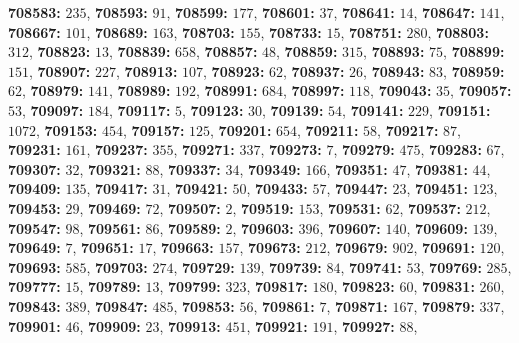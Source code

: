 \textsf{\bfseries 708583:} $235$, \textsf{\bfseries 708593:} $91$, \textsf{\bfseries 708599:} $177$, \textsf{\bfseries 708601:} $37$, \textsf{\bfseries 708641:} $14$, \textsf{\bfseries 708647:} $141$, \textsf{\bfseries 708667:} $101$, \textsf{\bfseries 708689:} $163$, \textsf{\bfseries 708703:} $155$, \textsf{\bfseries 708733:} $15$, \textsf{\bfseries 708751:} $280$, \textsf{\bfseries 708803:} $312$, \textsf{\bfseries 708823:} $13$, \textsf{\bfseries 708839:} $658$, \textsf{\bfseries 708857:} $48$, \textsf{\bfseries 708859:} $315$, \textsf{\bfseries 708893:} $75$, \textsf{\bfseries 708899:} $151$, \textsf{\bfseries 708907:} $227$, \textsf{\bfseries 708913:} $107$, \textsf{\bfseries 708923:} $62$, \textsf{\bfseries 708937:} $26$, \textsf{\bfseries 708943:} $83$, \textsf{\bfseries 708959:} $62$, \textsf{\bfseries 708979:} $141$, \textsf{\bfseries 708989:} $192$, \textsf{\bfseries 708991:} $684$, \textsf{\bfseries 708997:} $118$, \textsf{\bfseries 709043:} $35$, \textsf{\bfseries 709057:} $53$, \textsf{\bfseries 709097:} $184$, \textsf{\bfseries 709117:} $5$, \textsf{\bfseries 709123:} $30$, \textsf{\bfseries 709139:} $54$, \textsf{\bfseries 709141:} $229$, \textsf{\bfseries 709151:} $1072$, \textsf{\bfseries 709153:} $454$, \textsf{\bfseries 709157:} $125$, \textsf{\bfseries 709201:} $654$, \textsf{\bfseries 709211:} $58$, \textsf{\bfseries 709217:} $87$, \textsf{\bfseries 709231:} $161$, \textsf{\bfseries 709237:} $355$, \textsf{\bfseries 709271:} $337$, \textsf{\bfseries 709273:} $7$, \textsf{\bfseries 709279:} $475$, \textsf{\bfseries 709283:} $67$, \textsf{\bfseries 709307:} $32$, \textsf{\bfseries 709321:} $88$, \textsf{\bfseries 709337:} $34$, \textsf{\bfseries 709349:} $166$, \textsf{\bfseries 709351:} $47$, \textsf{\bfseries 709381:} $44$, \textsf{\bfseries 709409:} $135$, \textsf{\bfseries 709417:} $31$, \textsf{\bfseries 709421:} $50$, \textsf{\bfseries 709433:} $57$, \textsf{\bfseries 709447:} $23$, \textsf{\bfseries 709451:} $123$, \textsf{\bfseries 709453:} $29$, \textsf{\bfseries 709469:} $72$, \textsf{\bfseries 709507:} $2$, \textsf{\bfseries 709519:} $153$, \textsf{\bfseries 709531:} $62$, \textsf{\bfseries 709537:} $212$, \textsf{\bfseries 709547:} $98$, \textsf{\bfseries 709561:} $86$, \textsf{\bfseries 709589:} $2$, \textsf{\bfseries 709603:} $396$, \textsf{\bfseries 709607:} $140$, \textsf{\bfseries 709609:} $139$, \textsf{\bfseries 709649:} $7$, \textsf{\bfseries 709651:} $17$, \textsf{\bfseries 709663:} $157$, \textsf{\bfseries 709673:} $212$, \textsf{\bfseries 709679:} $902$, \textsf{\bfseries 709691:} $120$, \textsf{\bfseries 709693:} $585$, \textsf{\bfseries 709703:} $274$, \textsf{\bfseries 709729:} $139$, \textsf{\bfseries 709739:} $84$, \textsf{\bfseries 709741:} $53$, \textsf{\bfseries 709769:} $285$, \textsf{\bfseries 709777:} $15$, \textsf{\bfseries 709789:} $13$, \textsf{\bfseries 709799:} $323$, \textsf{\bfseries 709817:} $180$, \textsf{\bfseries 709823:} $60$, \textsf{\bfseries 709831:} $260$, \textsf{\bfseries 709843:} $389$, \textsf{\bfseries 709847:} $485$, \textsf{\bfseries 709853:} $56$, \textsf{\bfseries 709861:} $7$, \textsf{\bfseries 709871:} $167$, \textsf{\bfseries 709879:} $337$, \textsf{\bfseries 709901:} $46$, \textsf{\bfseries 709909:} $23$, \textsf{\bfseries 709913:} $451$, \textsf{\bfseries 709921:} $191$, \textsf{\bfseries 709927:} $88$, 
